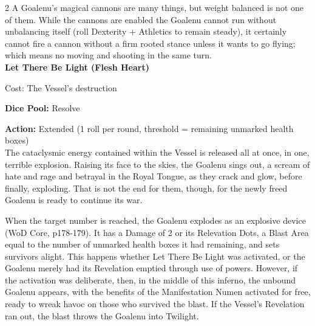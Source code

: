 \begin{multicols}{2}
A Goalenu's magical cannons are many things, but weight balanced is not one of them. While the cannons are enabled the Goalenu cannot run without unbalancing itself (roll Dexterity + Athletics to remain steady), it certainly cannot fire a cannon without a firm rooted stance unless it wants to go flying; which means no moving and shooting in the same turn. \\

\noindent\textbf{Let There Be Light (Flesh Heart)}

\noindent Cost: The Vessel's destruction

\noindent\textbf{Dice Pool:} Resolve

\noindent\textbf{Action:} Extended (1 roll per round, threshold = remaining unmarked health boxes)\\

\noindent The cataclysmic energy contained within the Vessel is released all at once, in one, terrible explosion. Raising its face to the skies, the Goalenu sings out, a scream of hate and rage and betrayal in the Royal Tongue, as they crack and glow, before finally, exploding. That is not the end for them, though, for the newly freed Goalenu is ready to continue its war.

When the target number is reached, the Goalenu explodes as an explosive device (WoD Core, p178-179). It has a Damage of 2 or its Relevation Dots, a Blast Area equal to the number of unmarked health boxes it had remaining, and sets survivors alight. This happens whether Let There Be Light was activated, or the Goalenu merely had its Revelation emptied through use of powers. However, if the activation was deliberate, then, in the middle of this inferno, the unbound Goalenu appears, with the benefits of the Manifestation Numen activated for free, ready to wreak havoc on those who survived the blast. If the Vessel's Revelation ran out, the blast throws the Goalenu into Twilight.






\end{multicols}\newpage{}
\label{scha:Mirrors}
